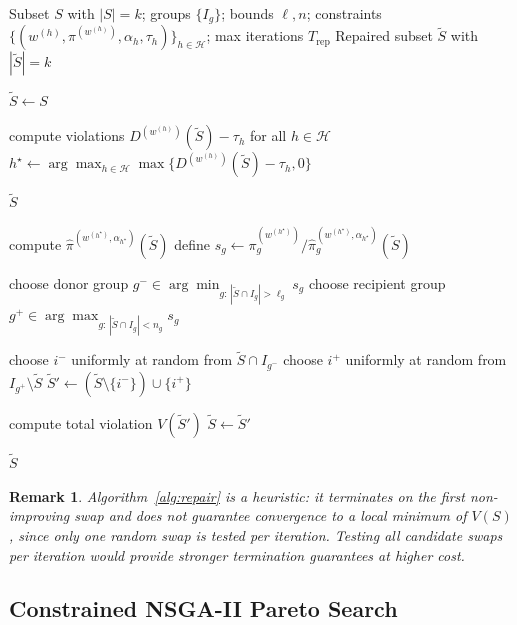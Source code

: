 \documentclass[10pt,journal]{IEEEtran}
\newcommand{\1}{\mathbf{1}}
\theoremstyle{ieeethm}
\newtheorem{remark}{Remark}
\begin{document}
\begin{algorithm}[t]
\caption{Swap-Based Repair for KL Proportionality Constraints}
\label{alg:repair}
\begin{algorithmic}[1]
\Require
Subset $S$ with $|S|=k$; groups $\{I_g\}$; bounds $\ell,n$;
constraints $\{(w^{(h)},\pi^{(w^{(h)})},\alpha_h,\tau_h)\}_{h\in\mathcal{H}}$;
max iterations $T_{\mathrm{rep}}$
\Ensure
Repaired subset $\tilde S$ with $|\tilde S|=k$

\State $\tilde S \gets S$

    \State compute violations $D^{(w^{(h)})}(\tilde S)-\tau_h$ for all $h\in\mathcal{H}$
    \State $h^\star\gets \arg\max_{h\in\mathcal{H}} \max\{D^{(w^{(h)})}(\tilde S)-\tau_h,0\}$

        \State \Return $\tilde S$
    \EndIf

    \State compute $\hat\pi^{(w^{(h^\star)},\alpha_{h^\star})}(\tilde S)$
    \State define $s_g \gets \pi_g^{(w^{(h^\star)})} / \hat\pi_g^{(w^{(h^\star)},\alpha_{h^\star})}(\tilde S)$

    \State choose donor group $g^- \in \arg\min_{g:\,|\tilde S\cap I_g|>\ell_g} s_g$
    \State choose recipient group $g^+ \in \arg\max_{g:\,|\tilde S\cap I_g|<n_g} s_g$

    \State choose $i^-$ uniformly at random from $\tilde S\cap I_{g^-}$
    \State choose $i^+$ uniformly at random from $I_{g^+}\setminus \tilde S$
    \State $\tilde S' \gets (\tilde S\setminus\{i^-\}) \cup \{i^+\}$

    \State compute total violation $V(\tilde S')$
        \State $\tilde S \gets \tilde S'$
    \Else
        \State \algorithmicbreak
    \EndIf
\EndFor

\State \Return $\tilde S$
\end{algorithmic}
\end{algorithm}

\begin{remark}
Algorithm~\ref{alg:repair} is a heuristic: it terminates on the first non-improving swap and
does not guarantee convergence to a local minimum of $V(S)$, since only one random swap is
tested per iteration. Testing all candidate swaps per iteration would provide stronger
termination guarantees at higher cost.
\end{remark}

\subsection{Constrained NSGA-II Pareto Search}
\label{subsec:nsga_loop}
\end{document}
